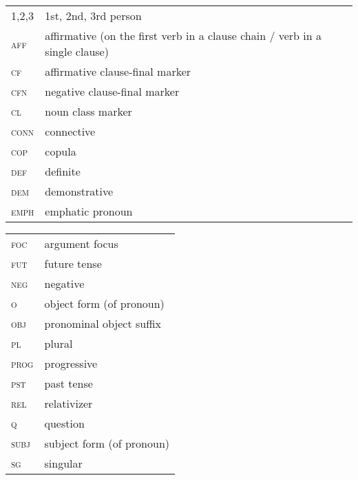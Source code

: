 \documentclass[output=paper]{langsci/langscibook}
\begin{document}
\begin{tabularx}{.55\textwidth}{lQ}
1,2,3 &   1st, 2nd, 3rd person    \\
\textsc{aff} & affirmative (on the first verb in a clause chain / verb in a single  clause)\\
\textsc{cf} &  affirmative clause-final marker\\
\textsc{cfn} & negative clause-final marker\\
\textsc{cl} & noun class marker\\
\textsc{conn} & connective\\
\textsc{cop} & copula\\
\textsc{def} & definite\\
\textsc{dem} & demonstrative\\
\textsc{emph} & emphatic pronoun\\
\end{tabularx}
\begin{tabularx}{.45\textwidth}{lX}
\textsc{foc} & argument focus\\
\textsc{fut} & future tense\\
\textsc{neg} & negative\\
\textsc{o} & object form (of pronoun)\\
\textsc{obj} & pronominal object suffix\\
\textsc{pl} & plural\\
\textsc{prog} & progressive\\
\textsc{pst} & past tense\\
\textsc{rel} & relativizer\\
\textsc{q} & question\\
\textsc{subj} & subject form (of pronoun)\\
\textsc{sg} & singular\\ 
\end{tabularx}

 \printbibliography[heading=subbibliography,notkeyword=this]
\end{document}
